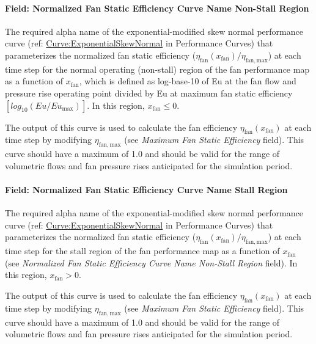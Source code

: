 \paragraph{Field: Normalized Fan Static Efficiency Curve Name Non-Stall Region}\label{field-normalized-fan-static-efficiency-curve-name-non-stall-region}

The required alpha name of the exponential-modified skew normal performance curve (ref: \hyperref[curveexponentialskewnormal]{Curve:ExponentialSkewNormal} in Performance Curves) that parameterizes the normalized fan static efficiency (\(\eta_{\mathrm{fan}}(x_{\mathrm{fan}}) / \eta_{\mathrm{fan, max}}\)) at each time step for the normal operating (non-stall) region of the fan performance map as a function of \(x_{\mathrm{fan}}\), which is defined as log-base-10 of Eu at the fan flow and pressure rise operating point divided by Eu at maximum fan static efficiency \([log_{10}(Eu / Eu_{\mathrm{max}})]\). In this region, \(x_{\mathrm{fan}} \le 0\).

The output of this curve is used to calculate the fan efficiency \(\eta_{\mathrm{fan}} (x_{\mathrm{fan}})\) at each time step by modifying \(\eta_{\mathrm{fan, max}}\) (see \emph{Maximum Fan Static Efficiency} field). This curve should have a maximum of 1.0 and should be valid for the range of volumetric flows and fan pressure rises anticipated for the simulation period.

\paragraph{Field: Normalized Fan Static Efficiency Curve Name Stall Region}\label{field-normalized-fan-static-efficiency-curve-name-stall-region}

The required alpha name of the exponential-modified skew normal performance curve (ref: \hyperref[curveexponentialskewnormal]{Curve:ExponentialSkewNormal} in Performance Curves) that parameterizes the normalized fan static efficiency (\(\eta_{\mathrm{fan}} (x_{\mathrm{fan}}) / \eta_{\mathrm{fan, max}}\)) at each time step for the stall region of the fan performance map as a function of \(x_{\mathrm{fan}}\) (see \emph{Normalized Fan Static Efficiency Curve Name Non-Stall Region} field). In this region, \(x_{\mathrm{fan}} > 0\).

The output of this curve is used to calculate the fan efficiency \(\eta_{\mathrm{fan}} ( x_{\mathrm{fan}} )\) at each time step by modifying \(\eta_{\mathrm{fan, max}}\) (see \emph{Maximum Fan Static Efficiency} field). This curve should have a maximum of 1.0 and should be valid for the range of volumetric flows and fan pressure rises anticipated for the simulation period.

